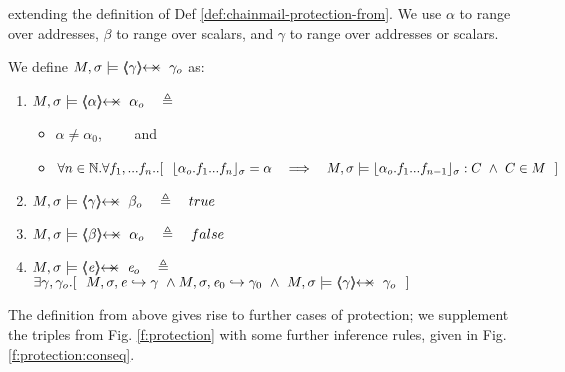 \begin{definition}
\label{def:chainmail-protection-from-ext}
extending the definition of Def 
\ref{def:chainmail-protection-from}. We use $\alpha$ to range over addresses, $\beta$  to range over scalars, and   $\gamma$ to range over addresses or scalars.

\noindent
We define  $\satisfiesA{M}{\sigma}{\protectedFrom{{\gamma}} {{\gamma_{o}}}} $ as:
\begin{enumerate}
\item
\label{cProtectedNew}
 $\satisfiesA{M}{\sigma}{\protectedFrom{{\alpha}} {{\alpha_{o}}}}   \ \ \ \triangleq $ 
  \begin{itemize}
 \item
$\alpha\neq \alpha_0$,
 \ \ \ \  and%
 \item
$\forall n\in\mathbb{N}. \forall f_1,...f_n..
[\ \ \interpret{\sigma}{\alpha_{o}.f_1...f_n}=\alpha \ \ \  \Longrightarrow \ \ \  \satisfiesA{M}{\sigma}{ {\interpret{\sigma}{\alpha_{o}.f_1...f_{n-1}}}:C} \ \wedge \ C\in M\ \ ]$
\end{itemize}
\item
 $\satisfiesA{M}{\sigma}{\protectedFrom{{\gamma}} {{\beta_{o}}}}   \ \ \ \triangleq  \ \ \ true$
 \item
 $\satisfiesA{M}{\sigma}{\protectedFrom{{\beta}} {{\alpha_{o}}}}   \ \ \ \triangleq  \ \ \ false$
  \item
$\satisfiesA{M}{\sigma}{\protectedFrom{{\re}} {{\re_{o}}}} \ \ \ \triangleq $ \\
  $\exists \gamma, \gamma_{o}. [\  \ \eval{M}{\sigma}{{\re}}{\gamma}\ \wedge \eval{M}{\sigma}{{\re_0}}{\gamma_0} \  \wedge \ 
  \satisfiesA{M}{\sigma}{\protectedFrom{{\gamma}} {{\gamma_{o}}}}
 \ \  ]$
 \end{enumerate}
 \end{definition} 

{The definition from above gives rise to further cases of  protection; we supplement the triples from 
Fig. \ref{f:protection} with some further inference rules, given   in Fig. \ref{f:protection:conseq}.}


